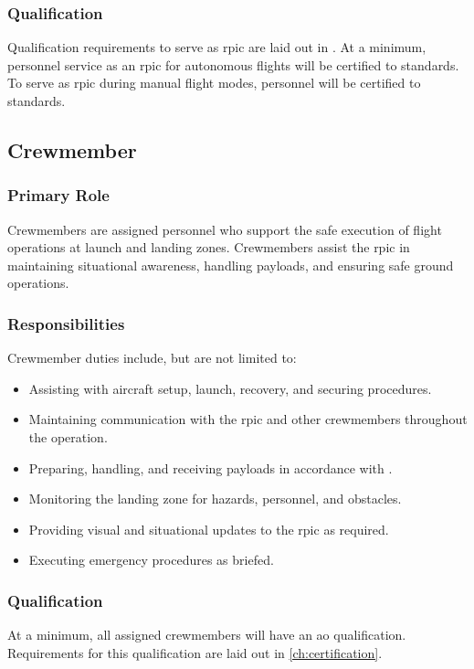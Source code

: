             \subsubsection{Qualification} Qualification requirements to serve as \ac{rpic} are laid out in . At a minimum, personnel service as an \ac{rpic} for autonomous flights will be certified to  standards. To serve as \ac{rpic} during manual flight modes, personnel will be certified to  standards.
    
        \subsection{Crewmember}\label{role:crewmember}

            \subsubsection{Primary Role} Crewmembers are assigned personnel who support the safe execution of \projectmars{} flight operations at launch and landing zones. Crewmembers assist the \ac{rpic} in maintaining situational awareness, handling payloads, and ensuring safe ground operations.

            \subsubsection{Responsibilities} Crewmember duties include, but are not limited to:
            \begin{itemize}
                \item Assisting with aircraft setup, launch, recovery, and securing procedures.
                \item Maintaining communication with the \ac{rpic} and other crewmembers throughout the operation.
                \item Preparing, handling, and receiving payloads in accordance with .
                \item Monitoring the landing zone for hazards, personnel, and obstacles.
                \item Providing visual and situational updates to the \ac{rpic} as required.
                \item Executing emergency procedures as briefed.
            \end{itemize}
            
            \subsubsection{Qualification} At a minimum, all assigned crewmembers will have an \ac{ao} qualification. Requirements for this qualification are laid out in \cref{ch:certification}.


